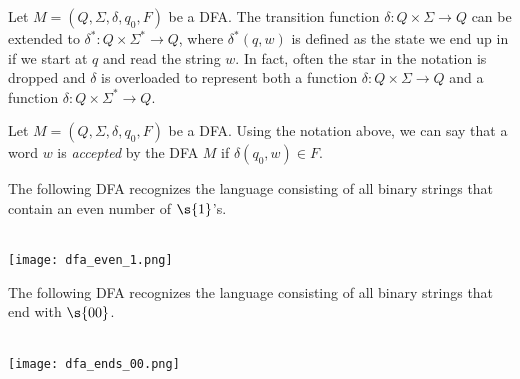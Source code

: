 \begin{definition} \label{definition:Extended-transition-function}
Let $M = (Q, \Sigma, \delta, q_0, F)$ be a DFA. The transition function $\delta : Q \times \Sigma \to Q$ can be extended to $\delta^* : Q \times \Sigma^* \to Q$, where $\delta^*(q, w)$ is defined as the state we end up in if we start at $q$ and read the string $w$. In fact, often the star in the notation is dropped and $\delta$ is overloaded to represent both a function $\delta : Q \times \Sigma \to Q$ and a function $\delta : Q \times \Sigma^* \to Q$. 
\end{definition}

\begin{note} \label{note:Alternative-definition-of-a-DFA-accepting-a-string}
Let $M = (Q, \Sigma, \delta, q_0, F)$ be a DFA. Using the notation above, we can say that a word $w$ is \emph{accepted} by the DFA $M$ if $\delta(q_0, w) \in F$.
\end{note}


\begin{flex}

\begin{example} \label{example:Even-number-of-1s}
The following DFA recognizes the language consisting of all binary strings that contain an even number of $\s{1}$'s.
\\\\
\begin{center}
    \texttt{[image: dfa\_even\_1.png]}
\end{center}
\end{example}

\begin{example} \label{example:Ends-with-00}
The following DFA recognizes the language consisting of all binary strings that end with $\s{00}$.
\\\\
\begin{center}
    \texttt{[image: dfa\_ends\_00.png]}
\end{center}
\end{example}
\end{flex}


